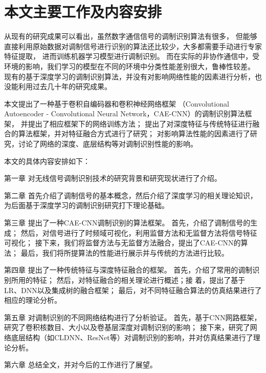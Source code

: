 \section{本文主要工作及内容安排}
从现有的研究成果可以看出，虽然数字通信信号的调制识别算法有很多，
但能够直接利用原始数据对调制信号进行识别的算法还比较少，大多都需要手动进行专家特征提取，
进而训练机器学习模型进行调制识别。
而在实际的非协作通信中，受环境的影响，我们学习的模型在不同的环境中分类性能差别很大，鲁棒性较差。
现有的基于深度学习的调制识别算法，并没有对影响网络性能的因素进行分析，也没能利用过去几十年的研究成果。\par

本文提出了一种基于卷积自编码器和卷积神经网络框架
（Convolutional Autoencoder - Convolutional Neural Network，CAE-CNN）的调制识别算法框架，
并提出了相应框架下的网络训练方法；
提出了对深度特征与传统特征进行融合的算法框架，并对特征融合方式进行了研究；
对影响算法性能的因素进行了研究，讨论了网络的深度、底层结构等对调制识别性能的影响。 \par

本文的具体内容安排如下：

第一章 对无线信号调制识别技术的研究背景和研究现状进行了介绍。\par

第二章 首先介绍了调制信号的基本概念，然后介绍了深度学习的相关理论知识，
为后面基于深度学习的调制识别研究打下理论基础。 \par

第三章 提出了一种CAE-CNN调制识别的算法框架。
首先，介绍了调制信号的生成；
然后，对信号进行了时频域可视化，利用监督方法和无监督方法将信号特征可视化；
接下来，我们将监督方法与无监督方法融合，提出了CAE-CNN的算法；
最后，我们将所提算法的性能进行展示并与传统的方法进行比较。 \par

第四章 提出了一种传统特征与深度特征融合的框架。
首先，介绍了常用的调制识别所用的特征；
然后，对特征融合的相关理论进行概述；接
着，提出了基于LR、DNN以及集成树的融合框架；
最后，对不同特征融合算法的仿真结果进行了相应的理论分析。 \par

第五章 对调制识别的不同网络结构进行了分析验证。
首先，基于CNN网路框架，研究了卷积核数目、大小以及卷基层深度对调制识别的影响；
接下来，研究了网络底层结构（如CLDNN、ResNet等）对调制识别的影响，并对仿真结果进行了理论分析。\par

第六章 总结全文，并对今后的工作进行了展望。\par
